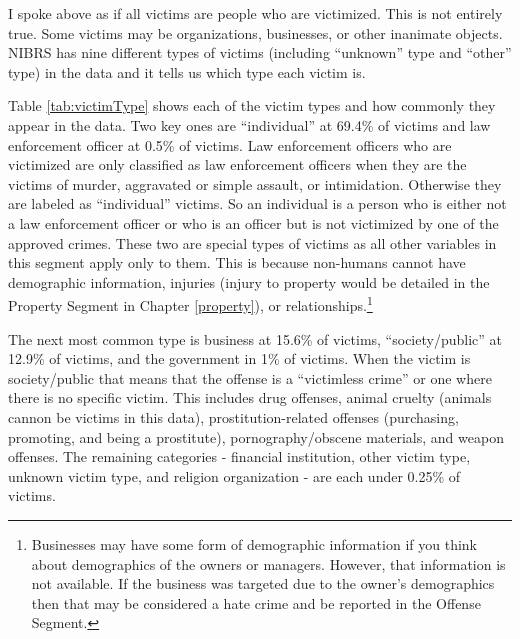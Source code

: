 \documentclass[
]{krantz}
\begin{document}
I spoke above as if all victims are people who are
victimized. This is not entirely true. Some victims may be
organizations, businesses, or other inanimate objects. NIBRS
has nine different types of victims (including ``unknown''
type and ``other'' type) in the data and it tells us which
type each victim is.

Table \ref{tab:victimType} shows each of the victim types
and how commonly they appear in the data. Two key ones are
``individual'' at 69.4\% of victims and law enforcement
officer at 0.5\% of victims. Law enforcement officers who
are victimized are only classified as law enforcement
officers when they are the victims of murder, aggravated or
simple assault, or intimidation. Otherwise they are labeled
as ``individual'' victims. So an individual is a person who
is either not a law enforcement officer or who is an officer
but is not victimized by one of the approved crimes. These
two are special types of victims as all other variables in
this segment apply only to them. This is because non-humans
cannot have demographic information, injuries (injury to
property would be detailed in the Property Segment in
Chapter \ref{property}), or relationships.\footnote{Businesses
  may have some form of demographic information if you think
  about demographics of the owners or managers. However,
  that information is not available. If the business was
  targeted due to the owner's demographics then that may be
  considered a hate crime and be reported in the Offense
  Segment.}

The next most common type is business at 15.6\% of victims,
``society/public'' at 12.9\% of victims, and the government
in 1\% of victims. When the victim is society/public that
means that the offense is a ``victimless crime'' or one
where there is no specific victim. This includes drug
offenses, animal cruelty (animals cannon be victims in this
data), prostitution-related offenses (purchasing, promoting,
and being a prostitute), pornography/obscene materials, and
weapon offenses. The remaining categories - financial
institution, other victim type, unknown victim type, and
religion organization - are each under 0.25\% of victims.
\end{document}
